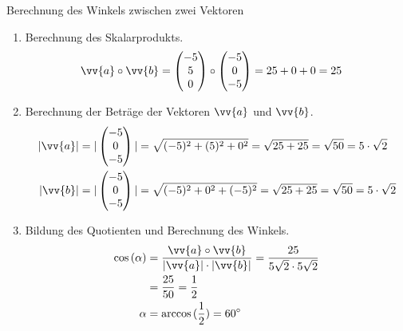 \begin{bsp}{Berechnung des Winkels zwischen zwei Vektoren}{}
\begin{enumerate}
    \item Berechnung des Skalarprodukts.
    \begin{equation*}
        \begin{split}
            \vv{a} \circ \vv{b} &= \begin{pmatrix} -5 \\5 \\0\end{pmatrix} \circ \begin{pmatrix} -5 \\0 \\-5 \end{pmatrix} = 25 +0 +0 = 25
            \end{split}
            \end{equation*}
    \item Berechnung der Beträge der Vektoren $\vv{a}$ und $\vv{b}$.
    \begin{equation*}
        \begin{split}
            |\vv{a}| & = |\begin{pmatrix} -5 \\0\\-5\end{pmatrix}| =  \sqrt{(-5)^2 + (5)^2 + 0^2}  = \sqrt{25+25} = \sqrt{50} = 5\cdot \sqrt{2}\\
            |\vv{b}| &= |\begin{pmatrix} -5 \\0\\-5\end{pmatrix} |= \sqrt{(-5)^2 + 0^2 + (-5)^2} = \sqrt{25+25}= \sqrt{50} = 5\cdot \sqrt{2}
            \end{split}
            \end{equation*}
    \item Bildung des Quotienten und Berechnung des Winkels.
    \begin{equation*}
        \begin{split}
            \cos{(\alpha)} &= \dfrac{\vv{a}\circ \vv{b}}{|\vv{a}| \cdot |\vv{b}|}= \dfrac{25}{5\sqrt{2} \cdot 5\sqrt{2}}\\
            &= \dfrac{25}{50} = \dfrac{1}{2}\\
            \alpha &= \arccos{(\dfrac{1}{2})} = 60^{\circ}
            \end{split}
            \end{equation*}
\end{enumerate}
\end{bsp}
